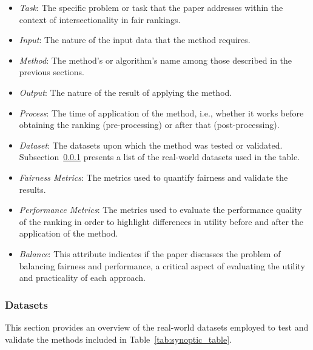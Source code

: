 \begin{itemize}
    \item \emph{Task}: The specific problem or task that the paper addresses within the context of intersectionality in fair rankings.
    
    \item \emph{Input}: The nature of the input data that the method requires.
    
    \item \emph{Method}: The method's or algorithm's name among those described in the previous sections.
    
    \item \emph{Output}: The nature of the result of applying the method.
    
    \item \emph{Process}: The time of application of the method, i.e., whether it works before obtaining the ranking (pre-processing) or after that (post-processing).
    
    \item \emph{Dataset}: The datasets upon which the method was tested or validated. Subsection~\ref{subsec:intrank_table_ds} presents a list of the real-world datasets used in the table.
    
    \item \emph{Fairness Metrics}: The metrics used to quantify fairness and validate the results.
    
    \item \emph{Performance Metrics}: The metrics used to evaluate the performance quality of the ranking in order to highlight differences in utility before and after the application of the method.
    
    \item \emph{Balance}: This attribute indicates if the paper discusses the problem of balancing fairness and performance, a critical aspect of evaluating the utility and practicality of each approach.

\end{itemize}


\subsubsection{Datasets}
\label{subsec:intrank_table_ds}

This section provides an overview of the real-world datasets employed to test and validate the methods included in Table~\ref{tab:synoptic_table}.


